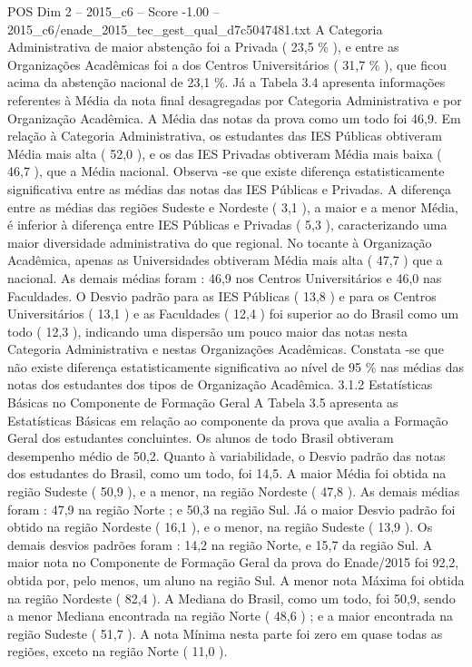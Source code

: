 \begin{textsample}{POS Dim 2 – 2015\_c6 – Score -1.00 – 2015\_c6/enade\_2015\_tec\_gest\_qual\_d7c5047481.txt}
A Categoria Administrativa de maior abstenção foi a Privada ( 23,5 \% ), e entre as Organizações Acadêmicas foi a dos Centros Universitários ( 31,7 \% ), que ficou acima da abstenção nacional de 23,1 \%.
Já a Tabela 3.4 apresenta informações referentes à Média da nota final desagregadas por Categoria Administrativa e por Organização Acadêmica.
A Média das notas da prova como um todo foi 46,9.
Em relação à Categoria Administrativa, os estudantes das IES Públicas obtiveram Média mais alta ( 52,0 ), e os das IES Privadas obtiveram Média mais baixa ( 46,7 ), que a Média nacional.
Observa -se que existe diferença estatisticamente significativa entre as médias das notas das IES Públicas e Privadas.
A diferença entre as médias das regiões Sudeste e Nordeste ( 3,1 ), a maior e a menor Média, é inferior à diferença entre IES Públicas e Privadas ( 5,3 ), caracterizando uma maior diversidade administrativa do que regional.
No tocante à Organização Acadêmica, apenas as Universidades obtiveram Média mais alta ( 47,7 ) que a nacional.
As demais médias foram : 46,9 nos Centros Universitários e 46,0 nas Faculdades.
O Desvio padrão para as IES Públicas ( 13,8 ) e para os Centros Universitários ( 13,1 ) e as Faculdades ( 12,4 ) foi superior ao do Brasil como um todo ( 12,3 ), indicando uma dispersão um pouco maior das notas nesta Categoria Administrativa e nestas Organizações Acadêmicas.
Constata -se que não existe diferença estatisticamente significativa ao nível de 95 \% nas médias das notas dos estudantes dos tipos de Organização Acadêmica. 3.1.2 Estatísticas Básicas no Componente de Formação Geral A Tabela 3.5 apresenta as Estatísticas Básicas em relação ao componente da prova que avalia a Formação Geral dos estudantes concluintes.
Os alunos de todo Brasil obtiveram desempenho médio de 50,2.
Quanto à variabilidade, o Desvio padrão das notas dos estudantes do Brasil, como um todo, foi 14,5.
A maior Média foi obtida na região Sudeste ( 50,9 ), e a menor, na região Nordeste ( 47,8 ).
As demais médias foram : 47,9 na região Norte ; e 50,3 na região Sul.
Já o maior Desvio padrão foi obtido na região Nordeste ( 16,1 ), e o menor, na região Sudeste ( 13,9 ).
Os demais desvios padrões foram : 14,2 na região Norte, e 15,7 da região Sul.
A maior nota no Componente de Formação Geral da prova do Enade/2015 foi 92,2, obtida por, pelo menos, um aluno na região Sul.
A menor nota Máxima foi obtida na região Nordeste ( 82,4 ).
A Mediana do Brasil, como um todo, foi 50,9, sendo a menor Mediana encontrada na região Norte ( 48,6 ) ; e a maior encontrada na região Sudeste ( 51,7 ).
A nota Mínima nesta parte foi zero em quase todas as regiões, exceto na região Norte ( 11,0 ).

\end{textsample}
